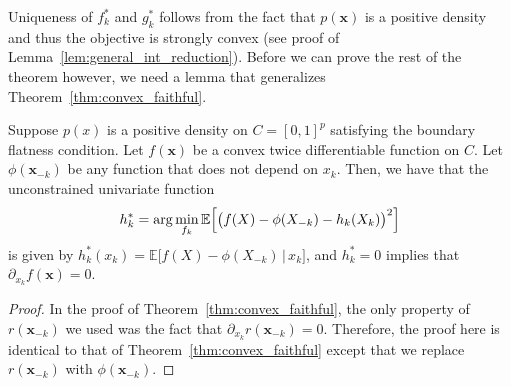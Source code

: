Uniqueness of $f^*_k$ and $g^*_k$ follows from the fact that $p(\mathbf{x})$ is a positive density and thus the objective is strongly convex (see proof of Lemma~\ref{lem:general_int_reduction}). Before we can prove the rest of the theorem however, we need a lemma that generalizes Theorem~\ref{thm:convex_faithful}.

\begin{lemma}
\label{cor:faithfulness_extension}
Suppose $p(x)$ is a positive density on $C=[0,1]^p$ satisfying the boundary flatness condition.
Let $f(\mathbf{x})$ be a convex twice differentiable function on $C$. Let $\phi(\mathbf{x}_{-k})$ be any function that does not depend on $x_k$. Then, we have that the unconstrained univariate function
 \begin{align}
h^*_k = \arg\min_{f_k} \mathbb{E} \Bigl[\bigl( f(X) 
           - \phi(X_{-k}) - h_k(X_k) \bigr)^2\Bigr]
\end{align}
is given by $h^*_k(x_k) = \mathbb{E}\bigl[ f(X) - \phi(X_{-k}) \,|\, x_k\bigr]$,
and $ h^*_k = 0$ implies that $\partial_{x_k} f(\mathbf{x}) = 0$.
\end{lemma}

\begin{proof}
  In the proof of Theorem~\ref{thm:convex_faithful}, the only property
  of $r(\mathbf{x}_{-k})$ we used was the fact that $\partial_{x_k}
  r(\mathbf{x}_{-k}) = 0$. Therefore, the proof here is identical to
  that of Theorem~\ref{thm:convex_faithful} except that we replace $r(\mathbf{x}_{-k})$ with $\phi(\mathbf{x}_{-k})$.
\end{proof}


